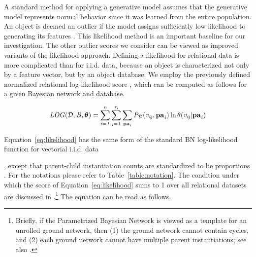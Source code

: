 {{	A standard method for applying a generative model assumes that the generative model represents normal behavior since it was learned from the entire population. An object is deemed an outlier if the model assigns sufficiently low likelihood to generating its features \cite{Cansado2008}. This likelihood method is an important baseline for our investigation.
The other outlier scores we consider can be viewed as improved variants of the likelihood approach. 
	Defining a likelihood for relational data is more complicated than for i.i.d. data, because an object is characterized not only by a feature vector, but by an object  database.
	We employ the previously defined normalized relational log-likelihood  score \cite{Schulte2011,Xiang2011}, which can be computed as follows for a given Bayesian network  and database.
	
	
	\begin{equation} \label{eq:likelihood}
		\it{LOG}(\mathcal{D},B,\boldsymbol{\theta}) =   \sum_{i=1}^{n}\sum_{j=1}^{r_{i}} \sum_{\mathbf{pa}_{i}}P_{\mathcal{D}}(v_{ij},\mathbf{pa}_{i})\ln \theta(v_{ij}|\mathbf{pa}_{i})  
	\end{equation}
	
	
	Equation~\eqref{eq:likelihood} has the same form of the standard BN log-likelihood function for vectorial i.i.d. data~\cite{Campos2006}}, except that parent-child instantiation counts are standardized to be proportions \cite{Schulte2011}. For the notations please refer to Table~\ref{table:notation}. The condition under which the score of Equation~\eqref{eq:likelihood} sums to 1 over all relational datasets are discussed in \cite{Schulte2011}.\footnote{Briefly, if the Parametrized Bayesian Network is viewed as a template for an unrolled ground network, then (1) the ground network cannot contain cycles, and (2) each ground network cannot have multiple parent instantiations; see also \cite{Heckerman+al:SRL07}.}  The equation can be read as follows.
	
}
